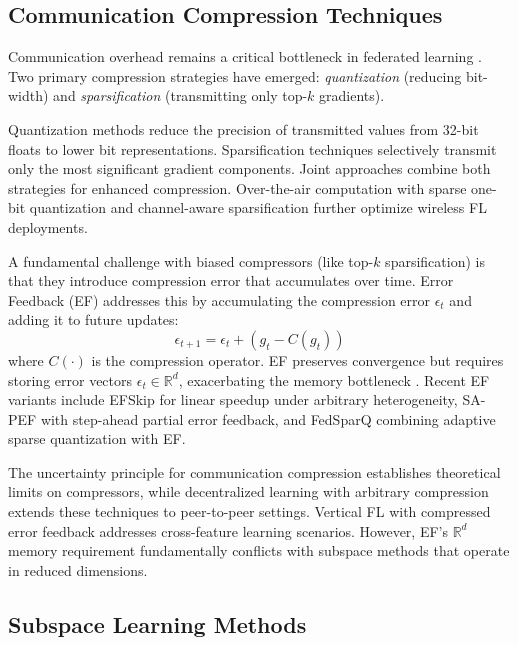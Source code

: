 \subsection{Communication Compression Techniques}

Communication overhead remains a critical bottleneck in federated learning \cite{konecný2016communication}. Two primary compression strategies have emerged: \emph{quantization} (reducing bit-width) and \emph{sparsification} (transmitting only top-$k$ gradients).

Quantization methods \cite{oh2024air,marnissi2024adaptive} reduce the precision of transmitted values from 32-bit floats to lower bit representations. Sparsification techniques \cite{jin2023channelaware,lu2025fedht} selectively transmit only the most significant gradient components. Joint approaches \cite{su2023joint,wu2023combination} combine both strategies for enhanced compression. Over-the-air computation with sparse one-bit quantization \cite{oh2024air} and channel-aware sparsification \cite{jin2023channelaware} further optimize wireless FL deployments.

A fundamental challenge with biased compressors (like top-$k$ sparsification) is that they introduce compression error that accumulates over time. Error Feedback (EF) \cite{safaryan2020uncertainty} addresses this by accumulating the compression error $\epsilon_t$ and adding it to future updates:
\[
\epsilon_{t+1} = \epsilon_t + (g_t - C(g_t))
\]
where $C(\cdot)$ is the compression operator. EF preserves convergence but requires storing error vectors $\epsilon_t \in \mathbb{R}^d$, exacerbating the memory bottleneck \cite{li2023errorfeedback}. Recent EF variants include EFSkip \cite{bao2025efskip} for linear speedup under arbitrary heterogeneity, SA-PEF \cite{redie2026sa-pef} with step-ahead partial error feedback, and FedSparQ \cite{medjadji2025fedsparq} combining adaptive sparse quantization with EF.

The uncertainty principle for communication compression \cite{safaryan2020uncertainty} establishes theoretical limits on compressors, while decentralized learning with arbitrary compression \cite{koloskova2019decentralized} extends these techniques to peer-to-peer settings. Vertical FL with compressed error feedback \cite{valdeira2025vertical} addresses cross-feature learning scenarios. However, EF's $\mathbb{R}^d$ memory requirement fundamentally conflicts with subspace methods that operate in reduced dimensions.

\subsection{Subspace Learning Methods}

